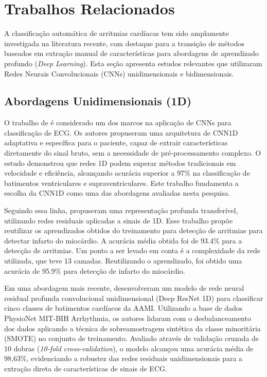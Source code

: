 \chapter{Trabalhos Relacionados}

A classificação automática de arritmias cardíacas tem sido amplamente investigada na literatura recente, com destaque para a transição de métodos 
baseados em extração manual de características para abordagens de aprendizado profundo (\textit{Deep Learning}). Esta seção apresenta estudos 
relevantes que utilizaram Redes Neurais Convolucionais (CNNs) unidimensionais e bidimensionais.

\section{Abordagens Unidimensionais (1D)}

O trabalho de  é considerado um dos marcos na aplicação de CNNs para classificação de ECG. Os autores propuseram uma arquitetura de 
CNN1D adaptativa e específica para o paciente, capaz de extrair características diretamente do sinal bruto, sem a necessidade de pré-processamento 
complexo. O estudo demonstrou que redes 1D podem superar métodos tradicionais em velocidade e eficiência, alcançando acurácia superior a 97\% na 
classificação de batimentos ventriculares e supraventriculares. Este trabalho fundamenta a escolha da CNN1D como uma das abordagens avaliadas nesta 
pesquisa.

Seguindo essa linha,  propuseram uma representação profunda transferível, utilizando redes residuais aplicadas a sinais de 1D. Esse 
trabalho propõe reutilizar os aprendizados obtidos do treinamento para detecção de arritmias para detectar infarto do miocárdio. 
A acurácia média obtida foi de 93.4\% para a detecção de arritmias. Um ponto a ser levado em conta é a complexidade da rede utilizada, que teve 13 camadas.
Reutilizando o aprendizado, foi obtido uma acurácia de 95.9\% para detecção de infarto do miocárdio.

Em uma abordagem mais recente,  desenvolveram um modelo de rede neural residual profunda convolucional unidimensional 
(Deep ResNet 1D) para classificar cinco classes de batimentos cardíacos da AAMI. Utilizando a base de dados PhysioNet MIT-BIH Arrhythmia, os autores 
lidaram com o desbalanceamento dos dados aplicando a técnica de sobreamostragem sintética da classe minoritária (SMOTE) no conjunto de 
treinamento. Avaliado através de validação cruzada de 10 dobras (\textit{10-fold cross-validation}), o modelo alcançou uma acurácia média de 98,63\%, 
evidenciando a robustez das redes residuais unidimensionais para a extração direta de características de sinais de ECG.

